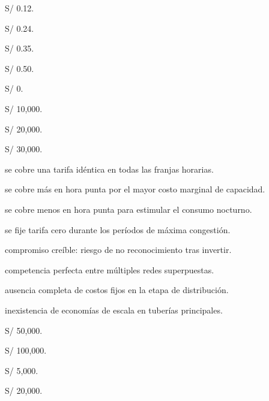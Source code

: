 \begin{opts}
    \item S/ 0.12.
    \item S/ 0.24.
    \item S/ 0.35.
    \item S/ 0.50.
\end{opts}

\begin{opts}
    \item S/ 0.
    \item S/ 10,000.
    \item S/ 20,000.
    \item S/ 30,000.
\end{opts}

\begin{opts}
    \item se cobre una tarifa idéntica en todas las franjas horarias.
    \item se cobre más en hora punta por el mayor costo marginal de capacidad.
    \item se cobre menos en hora punta para estimular el consumo nocturno.
    \item se fije tarifa cero durante los períodos de máxima congestión.
\end{opts}

\begin{opts}
    \item compromiso creíble: riesgo de no reconocimiento tras invertir.
    \item competencia perfecta entre múltiples redes superpuestas.
    \item ausencia completa de costos fijos en la etapa de distribución.
    \item inexistencia de economías de escala en tuberías principales.
\end{opts}

\begin{opts}
    \item S/ 50,000.
    \item S/ 100,000.
    \item S/ 5,000.
    \item S/ 20,000.
\end{opts}

